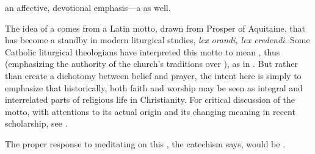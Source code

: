 an affective, devotional emphasis---a  as
well.%
\begin{Footnote}
    The idea of a  comes from a Latin motto, drawn from
    Prosper of Aquitaine, that has become a standby in modern liturgical
    studies, \emph{lex orandi, lex credendi}.
    Some Catholic liturgical theologians have interpreted this motto to mean
    , thus (emphasizing
    the authority of the church's traditions over ), as
    in \autocite{Kavanagh:LiturgicalTheology}.
    But rather than create a dichotomy between belief and prayer, the intent
    here is simply to emphasize that historically, both faith and worship may be
    seen as integral and interrelated parts of religious life in Christianity.
    For critical discussion of the motto, with attentions to its actual origin
    and its changing meaning in recent scholarship, see
    \autocite{Irwin:LexOrandi}.
\end{Footnote}
The proper response to meditating on this , the
catechism says, would be .%
    \Autocite
    [50: .]
    {Catholic:Catechismus1614}

